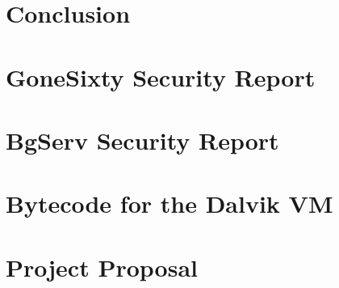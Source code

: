\documentclass[12pt,twoside,notitlepage]{report}
\begin{document}
\cleardoublepage
\chapter{Conclusion}



\cleardoublepage



\cleardoublepage

\appendix

\chapter{GoneSixty Security Report}
\label{chapter:Report_Gone60}

\cleardoublepage

\chapter{BgServ Security Report}
\label{chapter:Report_BgServ}

\cleardoublepage

\chapter{Bytecode for the Dalvik VM}

% 
\cleardoublepage

\chapter{Project Proposal}


\end{document}
